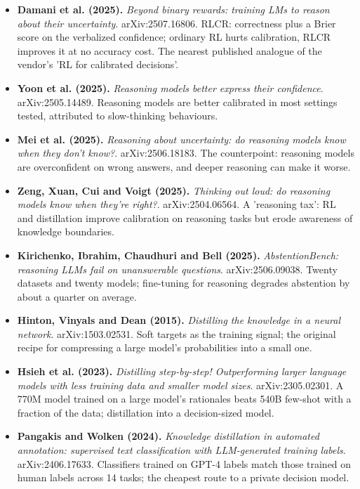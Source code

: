 \documentclass[11pt,letterpaper]{article}
\begin{document}
\begin{itemize}[leftmargin=1.2em,itemsep=3pt]
\item \textbf{Damani et al. (2025).} \textit{Beyond binary rewards: training LMs to reason about their uncertainty}. arXiv:2507.16806. RLCR: correctness plus a Brier score on the verbalized confidence; ordinary RL hurts calibration, RLCR improves it at no accuracy cost. The nearest published analogue of the vendor's 'RL for calibrated decisions'.
\item \textbf{Yoon et al. (2025).} \textit{Reasoning models better express their confidence}. arXiv:2505.14489. Reasoning models are better calibrated in most settings tested, attributed to slow-thinking behaviours.
\item \textbf{Mei et al. (2025).} \textit{Reasoning about uncertainty: do reasoning models know when they don't know?}. arXiv:2506.18183. The counterpoint: reasoning models are overconfident on wrong answers, and deeper reasoning can make it worse.
\item \textbf{Zeng, Xuan, Cui and Voigt (2025).} \textit{Thinking out loud: do reasoning models know when they're right?}. arXiv:2504.06564. A 'reasoning tax': RL and distillation improve calibration on reasoning tasks but erode awareness of knowledge boundaries.
\item \textbf{Kirichenko, Ibrahim, Chaudhuri and Bell (2025).} \textit{AbstentionBench: reasoning LLMs fail on unanswerable questions}. arXiv:2506.09038. Twenty datasets and twenty models; fine-tuning for reasoning degrades abstention by about a quarter on average.
\item \textbf{Hinton, Vinyals and Dean (2015).} \textit{Distilling the knowledge in a neural network}. arXiv:1503.02531. Soft targets as the training signal; the original recipe for compressing a large model's probabilities into a small one.
\item \textbf{Hsieh et al. (2023).} \textit{Distilling step-by-step! Outperforming larger language models with less training data and smaller model sizes}. arXiv:2305.02301. A 770M model trained on a large model's rationales beats 540B few-shot with a fraction of the data; distillation into a decision-sized model.
\item \textbf{Pangakis and Wolken (2024).} \textit{Knowledge distillation in automated annotation: supervised text classification with LLM-generated training labels}. arXiv:2406.17633. Classifiers trained on GPT-4 labels match those trained on human labels across 14 tasks; the cheapest route to a private decision model.
\end{itemize}
\end{document}
